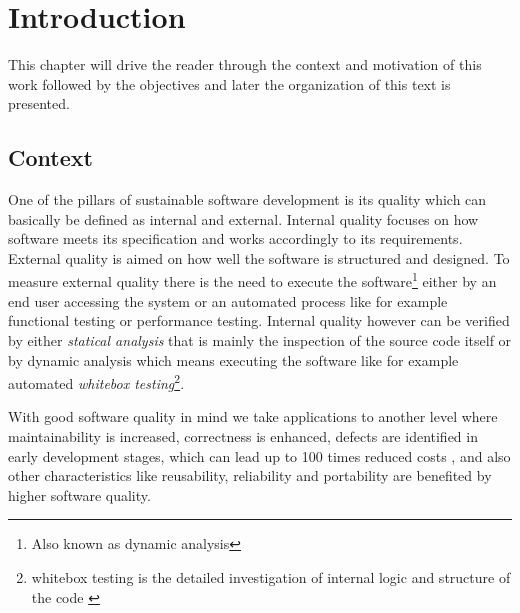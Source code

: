 \chapter{Introduction}
 This chapter will drive the reader through the context and motivation of this work followed by the objectives and later the organization of this text is presented.  
 

\section{Context}

One of the pillars of sustainable software development is its quality which can basically be defined as internal and external. Internal quality focuses on how software meets its specification and works accordingly to its requirements. External quality is aimed on how well the software is structured and designed. To measure external quality there is the need to execute the software\footnote{Also known as dynamic analysis} either by an end user accessing the system or an automated process like for example functional testing or performance testing. Internal quality however can be verified by either \emph{statical analysis} that is mainly the inspection of the source code itself or by dynamic analysis which means executing the software like for example automated \emph{whitebox testing}\footnote{whitebox testing is the detailed investigation of internal logic and structure of the code \citep{Khan 2012}}.   

With good software quality in mind we take applications to another level where maintainability is increased, correctness is enhanced, defects are identified in early development stages, which can lead up to 100 times reduced costs \citep{Beohm 2001}, and also other characteristics like reusability, reliability and portability are benefited by higher software quality.  

